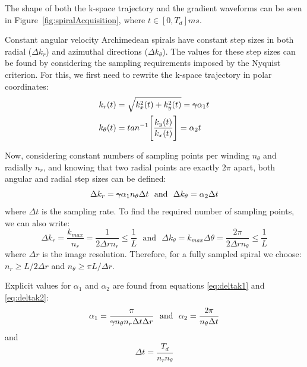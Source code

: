 The shape of both the k-space trajectory and the gradient waveforms can be seen in Figure~\ref{fig:spiralAcquisition}, where $t \in [0, T_d]ms$.

\hfill

Constant angular velocity Archimedean spirals have constant step sizes in both radial ($\Delta k_r$) and azimuthal directions ($\Delta k_{\theta}$).
The values for these step sizes can be found by considering the sampling requirements imposed by the Nyquist criterion.
For this, we first need to rewrite the k-space trajectory in polar coordinates:
\begin{equation}
    \begin{split}
        k_r(t) &= \sqrt{k_x^2(t) + k_y^2(t)} = \text{\sout{$\gamma$}} \alpha_1 t \\
        k_{\theta}(t) &= tan^{-1} \Bigg[ \frac{k_y(t)}{k_x(t)} \Bigg] = \alpha_2 t
    \end{split}
\end{equation}

Now, considering constant numbers of sampling points per winding $n_{\theta}$ and radially $n_r$, and knowing that two radial points are exactly $2\pi$ apart, both angular and radial step sizes can be defined:
\begin{equation}\label{eq:deltak1}
    \Delta k_r = \text{\sout{$\gamma$}} \alpha_1 n_{\theta} \Delta t  \, \, \text{  and  } \, \, \Delta k_{\theta} = \alpha_2 \Delta t
\end{equation}
where $\Delta t$ is the sampling rate.
To find the required number of sampling points, we can also write:
\begin{equation}\label{eq:deltak2}
    \Delta k_r = \frac{k_{max}}{n_r} = \frac{1}{2 \Delta r n_r} \leq \frac{1}{L} \, \, \text{  and  } \, \,  \Delta k_{\theta} = k_{max} \Delta \theta = \frac{2 \pi}{2 \Delta r n_{\theta}} \leq \frac{1}{L} 
\end{equation}
where $\Delta r$ is the image resolution.
Therefore, for a fully sampled spiral we choose: $n_r \geq L / 2 \Delta r$ and $n_{\theta} \geq \pi L / \Delta r$.

\hfill

Explicit values for $\alpha_1$ and $\alpha_2$ are found from equations \ref{eq:deltak1} and \ref{eq:deltak2}:
\begin{equation}
    \alpha_1 = \frac{\pi}{\text{\sout{$\gamma$}} n_{\theta} n_r \Delta t \Delta r}  \, \, \text{  and  } \, \, \alpha_2 = \frac{2 \pi}{n_{\theta} \Delta t}
\end{equation}
and
\begin{equation}
    \Delta t = \frac{T_d}{n_r n_{\theta}}
\end{equation}

